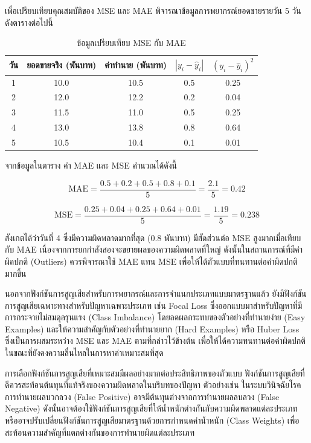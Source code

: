 \begin{exmp}
\label{exmp:mae_vs_mse_comparison}
เพื่อเปรียบเทียบคุณสมบัติของ MSE และ MAE พิจารณาข้อมูลการพยากรณ์ยอดขายรายวัน 5 วัน ดังตารางต่อไปนี้

\begin{table}[h!]
\centering
\caption{ข้อมูลเปรียบเทียบ MSE กับ MAE}
\label{tab:mse_mae_comparison}
\begin{tabular}{|c|c|c|c|c|}
\hline
\textbf{วัน} & \textbf{ยอดขายจริง (พันบาท)} & \textbf{ค่าทำนาย (พันบาท)} & \textbf{$|y_i - \hat{y}_i|$} & \textbf{$(y_i - \hat{y}_i)^2$} \\ \hline
1 & 10.0 & 10.5 & 0.5 & 0.25 \\ \hline
2 & 12.0 & 12.2 & 0.2 & 0.04 \\ \hline
3 & 11.5 & 11.0 & 0.5 & 0.25 \\ \hline
4 & 13.0 & 13.8 & 0.8 & 0.64 \\ \hline
5 & 10.5 & 10.4 & 0.1 & 0.01 \\ \hline
\end{tabular}
\end{table}

จากข้อมูลในตาราง ค่า MAE และ MSE คำนวณได้ดังนี้

\[
\text{MAE} = \frac{0.5 + 0.2 + 0.5 + 0.8 + 0.1}{5} = \frac{2.1}{5} = 0.42
\]

\[
\text{MSE} = \frac{0.25 + 0.04 + 0.25 + 0.64 + 0.01}{5} = \frac{1.19}{5} = 0.238
\]

สังเกตได้ว่าวันที่ 4 ซึ่งมีความผิดพลาดมากที่สุด (0.8 พันบาท) มีสัดส่วนต่อ MSE สูงมากเมื่อเทียบกับ MAE เนื่องจากการยกกำลังสองจะขยายผลของความผิดพลาดที่ใหญ่ ดังนั้นในสถานการณ์ที่มีค่าผิดปกติ (Outliers) ควรพิจารณาใช้ MAE แทน MSE เพื่อให้ได้ตัวแบบที่ทนทานต่อค่าผิดปกติมากขึ้น
\end{exmp}

นอกจากฟังก์ชันการสูญเสียสำหรับการพยากรณ์และการจำแนกประเภทแบบมาตรฐานแล้ว ยังมีฟังก์ชันการสูญเสียเฉพาะทางสำหรับปัญหาเฉพาะประเภท เช่น Focal Loss ซึ่งออกแบบมาสำหรับปัญหาที่มีการกระจายไม่สมดุลรุนแรง (Class Imbalance) โดยลดผลกระทบของตัวอย่างที่ทำนายง่าย (Easy Examples) และให้ความสำคัญกับตัวอย่างที่ทำนายยาก (Hard Examples) หรือ Huber Loss ซึ่งเป็นการผสมระหว่าง MSE และ MAE ตามที่กล่าวไว้ข้างต้น เพื่อให้ได้ความทนทานต่อค่าผิดปกติในขณะที่ยังคงความลื่นไหลในการหาค่าเหมาะสมที่สุด

การเลือกฟังก์ชันการสูญเสียที่เหมาะสมมีผลอย่างมากต่อประสิทธิภาพของตัวแบบ ฟังก์ชันการสูญเสียที่ดีควรสะท้อนต้นทุนที่แท้จริงของความผิดพลาดในบริบทของปัญหา ตัวอย่างเช่น ในระบบวินิจฉัยโรค การทำนายผลบวกลวง (False Positive) อาจมีต้นทุนต่างจากการทำนายผลลบลวง (False Negative) ดังนั้นอาจต้องใช้ฟังก์ชันการสูญเสียที่ให้น้ำหนักต่างกันกับความผิดพลาดแต่ละประเภท หรืออาจปรับเปลี่ยนฟังก์ชันการสูญเสียมาตรฐานด้วยการกำหนดค่าน้ำหนัก (Class Weights) เพื่อสะท้อนความสำคัญที่แตกต่างกันของการทำนายผิดแต่ละประเภท

